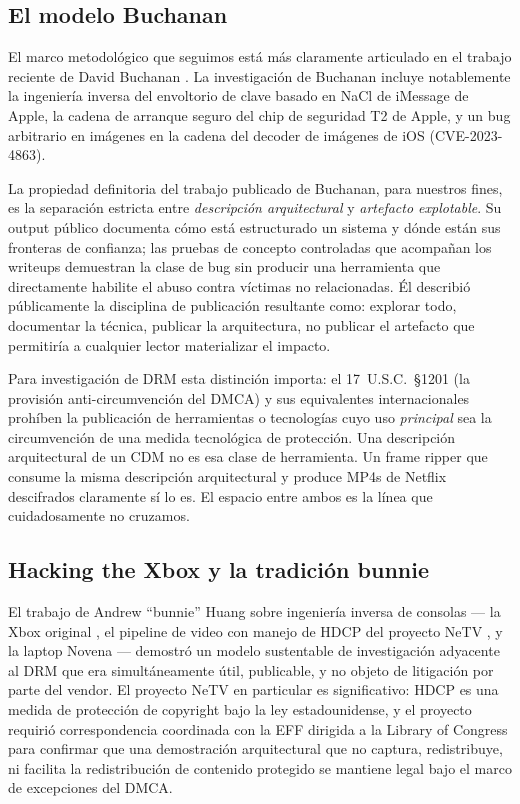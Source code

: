 \documentclass[11pt,letterpaper]{article}
\begin{document}
\subsection{El modelo Buchanan}
\label{sec:ante-buchanan}

El marco metodológico que seguimos está más claramente
articulado en el trabajo reciente de David Buchanan
\cite{buchanan-blog, buchanan-imessage, buchanan-t2}. La
investigación de Buchanan incluye notablemente la ingeniería
inversa del envoltorio de clave basado en NaCl de iMessage de
Apple, la cadena de arranque seguro del chip de seguridad T2 de
Apple, y un bug arbitrario en imágenes en la cadena del decoder
de imágenes de iOS (CVE-2023-4863).

La propiedad definitoria del trabajo publicado de Buchanan, para
nuestros fines, es la separación estricta entre
\emph{descripción arquitectural} y \emph{artefacto explotable}.
Su output público documenta cómo está estructurado un sistema y
dónde están sus fronteras de confianza; las pruebas de concepto
controladas que acompañan los writeups demuestran la clase de bug
sin producir una herramienta que directamente habilite el abuso
contra víctimas no relacionadas. Él describió públicamente la
disciplina de publicación resultante como: explorar todo,
documentar la técnica, publicar la arquitectura, no publicar el
artefacto que permitiría a cualquier lector materializar el
impacto.

Para investigación de DRM esta distinción importa: el 17~U.S.C.~§1201
(la provisión anti-circumvención del DMCA) y sus equivalentes
internacionales prohíben la publicación de herramientas o
tecnologías cuyo uso \emph{principal} sea la circumvención de una
medida tecnológica de protección. Una descripción arquitectural
de un CDM no es esa clase de herramienta. Un frame ripper que
consume la misma descripción arquitectural y produce MP4s de
Netflix descifrados claramente sí lo es. El espacio entre ambos
es la línea que cuidadosamente no cruzamos.

\subsection{Hacking the Xbox y la tradición bunnie}
\label{sec:ante-bunnie}

El trabajo de Andrew ``bunnie'' Huang sobre ingeniería inversa de
consolas --- la Xbox original \cite{bunnie-xbox-book}, el pipeline
de video con manejo de HDCP del proyecto NeTV
\cite{bunnie-nettv}, y la laptop Novena --- demostró un modelo
sustentable de investigación adyacente al DRM que era
simultáneamente útil, publicable, y no objeto de litigación por
parte del vendor. El proyecto NeTV en particular es significativo:
HDCP es una medida de protección de copyright bajo la ley
estadounidense, y el proyecto requirió correspondencia coordinada
con la EFF dirigida a la Library of Congress para confirmar que
una demostración arquitectural que no captura, redistribuye, ni
facilita la redistribución de contenido protegido se mantiene
legal bajo el marco de excepciones del DMCA.
\end{document}

